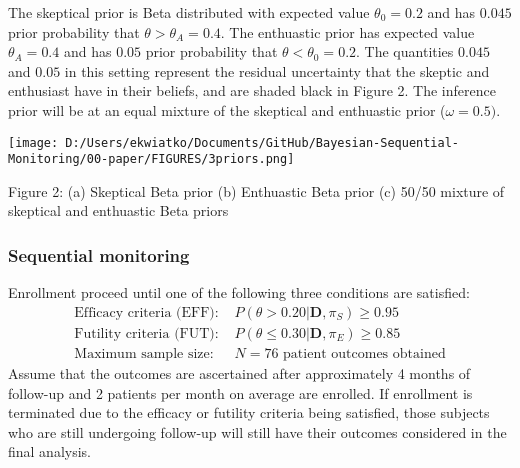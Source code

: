 \documentclass[12pt]{article}
\begin{document}
The skeptical prior is Beta distributed with expected value $\theta_0=0.2$ and has $0.045$ prior probability that $\theta>\theta_A=0.4$. The enthuastic prior has expected value $\theta_A=0.4$ and has $0.05$ prior probability that $\theta<\theta_0=0.2$. The quantities $0.045$ and $0.05$ in this setting represent the residual uncertainty that the skeptic and enthusiast have in their beliefs, and are shaded black in Figure 2. The inference prior will be at an equal mixture of the skeptical and enthuastic prior ($\omega=0.5)$.



\begin{center}
\texttt{[image: D:/Users/ekwiatko/Documents/GitHub/Bayesian-Sequential-Monitoring/00-paper/FIGURES/3priors.png]}

Figure 2: (a) Skeptical Beta prior (b) Enthuastic Beta prior (c) 50/50 mixture of skeptical and enthuastic Beta priors
\end{center}




\newpage
\subsubsection{Sequential monitoring}
Enrollment proceed until one of the following three conditions are satisfied:
\begin{align*}
\text{Efficacy criteria (EFF): }&P(\theta>0.20|\mathbf{D},\pi_S)\geq 0.95\\
\text{Futility criteria (FUT): }&P(\theta\leq 0.30|\mathbf{D},\pi_E)\geq 0.85\\
\text{Maximum sample size: }&N=76 \text{ patient outcomes obtained}
\end{align*}
Assume that the outcomes are ascertained after approximately 4 months of follow-up and 2 patients per month on average are enrolled. If enrollment is terminated due to the efficacy or futility criteria being satisfied, those subjects who are still undergoing follow-up will still have their outcomes considered in the final analysis.
\end{document}
